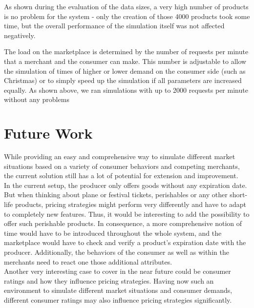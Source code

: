 As shown during the evaluation of the data sizes, a very high number of products is no problem for the system - only the creation of those 4000 products took some time, but the overall performance of the simulation itself was not affected negatively. 

The load on the marketplace is determined by the number of requests per minute that a merchant and the consumer can make. This number is adjustable to allow the simulation of times of higher or lower demand on the consumer side (such as Christmas) or to simply speed up the simulation if all parameters are increased equally. As shown above, we ran simulations with up to 2000 requests per minute without any problems



\section{Future Work}
\label{sec:FutureWork}
%
While providing an easy and comprehensive way to simulate different market situations based on a variety of consumer behaviors and competing merchants, the current solution still has a lot of potential for extension and improvement. \\

In the current setup, the producer only offers goods without any expiration date. But when thinking about plane or festival tickets, perishables or any other short-life products, pricing strategies might perform very differently and have to adapt to completely new features. Thus, it would be interesting to add the possibility to offer such perishable products. In consequence, a more comprehensive notion of time would have to be introduced throughout the whole system, and the marketplace would have to check and verify a product's expiration date with the producer. Additionally, the behaviors of the consumer as well as within the merchants need to react one those additional attributes.\\

Another very interesting case to cover in the near future could be consumer ratings and how they influence pricing strategies. Having now such an environment to simulate different market situations and consumer demands, different consumer ratings may also influence pricing strategies significantly. \\

